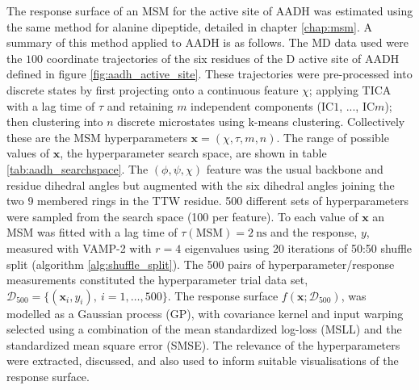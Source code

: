 The response surface of an MSM for the active site of AADH was estimated using the same method for alanine dipeptide, detailed in chapter \ref{chap:msm}. A summary of this method applied to AADH is as follows. The MD data used were the $100$ coordinate trajectories of the six residues of the D active site of AADH defined in figure \ref{fig:aadh_active_site}. These trajectories were pre-processed into discrete states by first projecting onto a continuous feature $\chi$; applying TICA with a lag time of $\tau$ and retaining $m$ independent components (IC$1$, ..., IC$m$);  then clustering into $n$ discrete microstates using k-means clustering. Collectively these are the MSM hyperparameters $\mathbf{x} = (\chi, \tau, m, n)$. The range of possible values of $\mathbf{x}$, the hyperparameter search space, are shown in table \ref{tab:aadh_searchspace}. The $(\phi, \psi, \chi)$ feature  was the usual backbone and residue dihedral angles but augmented with the six dihedral angles joining the two \num{9} membered rings in the TTW residue. \num{500} different sets of hyperparameters were sampled from the search space (\num{100} per feature). To each value of $\mathbf{x}$ an MSM was fitted with a lag time of $\tau(\mathrm{MSM}) = \SI{2}{\nano\second}$ and the response, $y$, measured with VAMP-2 with $r=4$ eigenvalues using 20 iterations of 50:50 shuffle split (algorithm \ref{alg:shuffle_split}). The \num{500} pairs of hyperparameter/response measurements  constituted the hyperparameter trial data set, $\mathcal{D}_{500} = \{(\mathbf{x}_{i}, y_{i}),\ i = 1, \ldots, 500\}$. The response surface $f(\mathbf{x}; \mathcal{D}_{500})$, was modelled as a Gaussian process (GP), with covariance kernel and input warping selected using a combination of the mean standardized log-loss (MSLL) and the standardized mean square error (SMSE). The relevance of the hyperparameters were extracted, discussed, and also used to inform suitable visualisations of the response surface. 

